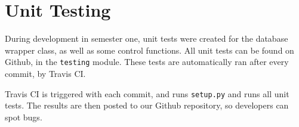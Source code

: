 \section{Unit Testing}
\label{sec:unit-testing}
\pagestyle{cameron}

During development in semester one, unit tests were created for the database wrapper class, as well as some control functions. All unit tests can be found on Github, in the \texttt{testing} module. These tests are automatically ran after every commit, by Travis \gls{CI}.

Travis \gls{CI} is triggered with each commit, and runs \texttt{setup.py} and runs all unit tests. The results are then posted to our Github repository, so developers can spot bugs.

